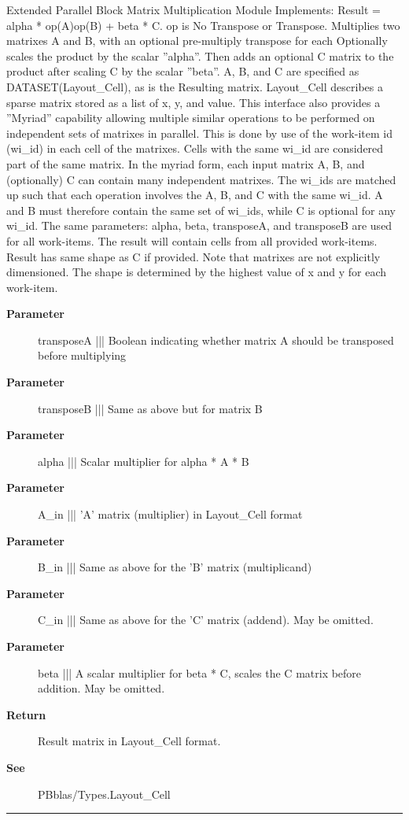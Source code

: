 \par
Extended Parallel Block Matrix Multiplication Module Implements: Result = alpha * op(A)op(B) + beta * C. op is No Transpose or Transpose. Multiplies two matrixes A and B, with an optional pre-multiply transpose for each Optionally scales the product by the scalar ''alpha''. Then adds an optional C matrix to the product after scaling C by the scalar ''beta''. A, B, and C are specified as DATASET(Layout\_Cell), as is the Resulting matrix. Layout\_Cell describes a sparse matrix stored as a list of x, y, and value. This interface also provides a ''Myriad'' capability allowing multiple similar operations to be performed on independent sets of matrixes in parallel. This is done by use of the work-item id (wi\_id) in each cell of the matrixes. Cells with the same wi\_id are considered part of the same matrix. In the myriad form, each input matrix A, B, and (optionally) C can contain many independent matrixes. The wi\_ids are matched up such that each operation involves the A, B, and C with the same wi\_id. A and B must therefore contain the same set of wi\_ids, while C is optional for any wi\_id. The same parameters: alpha, beta, transposeA, and transposeB are used for all work-items. The result will contain cells from all provided work-items. Result has same shape as C if provided. Note that matrixes are not explicitly dimensioned. The shape is determined by the highest value of x and y for each work-item.

\par
\begin{description}
\item [\textbf{Parameter}] transposeA ||| Boolean indicating whether matrix A should be transposed before multiplying
\item [\textbf{Parameter}] transposeB ||| Same as above but for matrix B
\item [\textbf{Parameter}] alpha ||| Scalar multiplier for alpha * A * B
\item [\textbf{Parameter}] A\_in ||| 'A' matrix (multiplier) in Layout\_Cell format
\item [\textbf{Parameter}] B\_in ||| Same as above for the 'B' matrix (multiplicand)
\item [\textbf{Parameter}] C\_in ||| Same as above for the 'C' matrix (addend). May be omitted.
\item [\textbf{Parameter}] beta ||| A scalar multiplier for beta * C, scales the C matrix before addition. May be omitted.
\item [\textbf{Return}] Result matrix in Layout\_Cell format.
\item [\textbf{See}] PBblas/Types.Layout\_Cell
\end{description}

\rule{\textwidth}{0.4pt}

